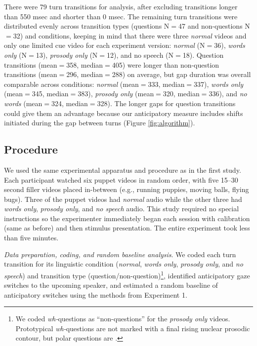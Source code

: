 \documentclass[authoryear, 12pt]{elsarticle}
\begin{document}
There were 79 turn transitions for analysis, after excluding transitions longer than 550 msec and shorter than 0 msec. The remaining turn transitions were distributed evenly across transition types (questions N$=$47 and non-questions N$=$32) and conditions, keeping in mind that there were three \textit{normal} videos and only one limited cue video for each experiment version: \textit{normal} (N$=$36), \textit{words only} (N$=$13), \textit{prosody only} (N$=$12), and {no speech} (N$=$18). Question transitions (mean$=$358, median$=$405) were longer than non-question transitions (mean$=$296, median$=$288) on average, but gap duration was overall comparable across conditions: \textit{normal} (mean$=$333, median$=$337), \textit{words only} (mean$=$345, median$=$383), \textit{prosody only} (mean$=$320, median$=$336), and \textit{no words} (mean$=$324, median$=$328). The longer gaps for question transitions could give them an advantage because our anticipatory measure includes shifts initiated during the gap between turns (Figure \ref{fig:algorithm}).

\subsection{Procedure}
We used the same experimental apparatus and procedure as in the first study. Each participant watched six puppet videos in random order, with five 15--30 second filler videos placed in-between (e.g., running puppies, moving balls, flying bugs). Three of the puppet videos had \textit{normal} audio while the other three had \textit{words only}, \textit{prosody only}, and \textit{no speech} audio. This study required no special instructions so the experimenter immediately began each session with calibration (same as before) and then stimulus presentation. The entire experiment took less than five minutes.

\textit{Data preparation, coding, and random baseline analysis}. We coded each turn transition for its linguistic condition (\textit{normal}, \textit{words only}, \textit{prosody only}, and \textit{no speech}) and transition type (question/non-question)\footnote{We coded \textit{wh-}questions as ``non-questions'' for the \textit{prosody only} videos. Prototypical \textit{wh-}questions are not marked with a final rising nuclear prosodic contour, but polar questions are \citep{hedberg2010}.}, identified anticipatory gaze switches to the upcoming speaker, and estimated a random baseline of anticipatory switches using the methods from Experiment 1.
\end{document}
